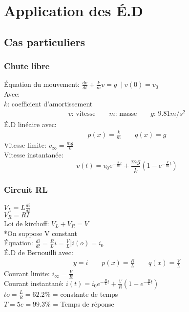 \section{Application des É.D}
\vspace{-2\baselineskip}
\subsection*{Cas particuliers}

\subsubsection{Chute libre}
\raggedright
Équation du mouvement: \(\frac{dv}{dt}+\frac{k}{m}v=g \;\mid v(0)=v_0\)\\
Avec:\\
$k$: coefficient d'amortissement
\begin{gather*}
 v\text{: vitesse} \qquad m\text{: masse} \qquad g\text{: } 9.81 m/s^2
\end{gather*}
É.D linéaire avec:
\begin{gather*}
  p(x)=\frac{k}{m} \qquad  q(x)=g
\end{gather*}
Vitesse limite: \(v_\infty = \frac{mg}{k}\)\\\vspace{2.5pt}
Vitesse instantanée: \[v(t)=v_0 e^{-\frac{k}{m}t}+\frac{mg}{k}(1-e^{-\frac{k}{m}t})\]

\subsubsection*{Circuit RL}
$V_L = L\frac{di}{dt}$\\\vspace{5pt}
$V_R=RI$\\\vspace{5pt}
Loi de kirchoff: \(V_L+V_R=V\)\\
*On suppose V constant\\\vspace{5pt}
Équation: \(\frac{di}{dt}=\frac{R}{L}i=\frac{V}{L} |i(o)=i_0\)\\
É.D de Bernouilli avec:
\begin{gather*}
 y=i \qquad p(x)=\frac{R}{L} \qquad q(x)=\frac{V}{L}
\end{gather*}
Courant limite: \(i_\infty=\frac{V}{R}\)\\
Courant instantané: \(i(t)=i_0e^{-\frac{R}{L}t}+\frac{V}{R}(1-e^{-\frac{R}{L}t})\)\\
$to=\frac{L}{R}=62.2\%$ = constante de temps\\\vspace{5pt}
$T=5e=99.3\%$ = Temps de réponse\\\vspace{5pt}

